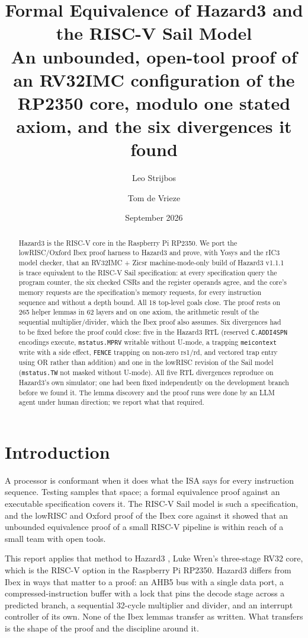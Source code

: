 \documentclass[11pt]{article}
\title{Formal Equivalence of Hazard3 and the RISC-V Sail Model\\
\large An unbounded, open-tool proof of an RV32IMC configuration of the RP2350 core,
modulo one stated axiom, and the six divergences it found}
\author{Leo Strijbos \and Tom de Vrieze}
\date{September 2026}
\newcommand{\code}[1]{\texttt{#1}}
\begin{document}
\maketitle

\begin{abstract}
Hazard3 is the RISC-V core in the Raspberry Pi RP2350. We port the lowRISC/Oxford
Ibex proof harness to Hazard3 and prove, with Yosys and the rIC3 model checker,
that an RV32IMC + Zicsr machine-mode-only build of Hazard3 v1.1.1 is trace
equivalent to the RISC-V Sail specification: at every specification query the
program counter, the six checked CSRs and the register operands agree, and the
core's memory requests are the specification's memory requests, for every
instruction sequence and without a depth bound. All 18 top-level goals close.
The proof rests on 265 helper lemmas in 62 layers and on one axiom, the
arithmetic result of the sequential multiplier/divider, which the Ibex proof
also assumes. Six divergences had to be fixed before the proof could close:
five in the Hazard3 RTL (reserved \code{C.ADDI4SPN} encodings execute,
\code{mstatus.MPRV} writable without U-mode, a trapping \code{meicontext} write
with a side effect, \code{FENCE} trapping on non-zero rs1/rd, and vectored trap
entry using OR rather than addition) and one in the lowRISC revision of the Sail
model (\code{mstatus.TW} not masked without U-mode). All five RTL divergences
reproduce on Hazard3's own simulator; one had been fixed independently on the
development branch before we found it. The lemma discovery and the proof runs
were done by an LLM agent under human direction; we report what that required.
\end{abstract}

\section{Introduction}

A processor is conformant when it does what the ISA says for every instruction
sequence. Testing samples that space; a formal equivalence proof against an
executable specification covers it. The RISC-V Sail model is such a
specification, and the lowRISC and Oxford proof of the Ibex core against it
\cite{ibexformal} showed that an unbounded equivalence proof of a small RISC-V
pipeline is within reach of a small team with open tools.

This report applies that method to Hazard3 \cite{hazard3}, Luke Wren's
three-stage RV32 core, which is the RISC-V option in the Raspberry Pi RP2350.
Hazard3 differs from Ibex in ways that matter to a proof: an AHB5 bus with a
single data port, a compressed-instruction buffer with a lock that pins the
decode stage across a predicted branch, a sequential 32-cycle multiplier and
divider, and an interrupt controller of its own. None of the Ibex lemmas
transfer as written. What transfers is the shape of the proof and the
discipline around it.
\end{document}
